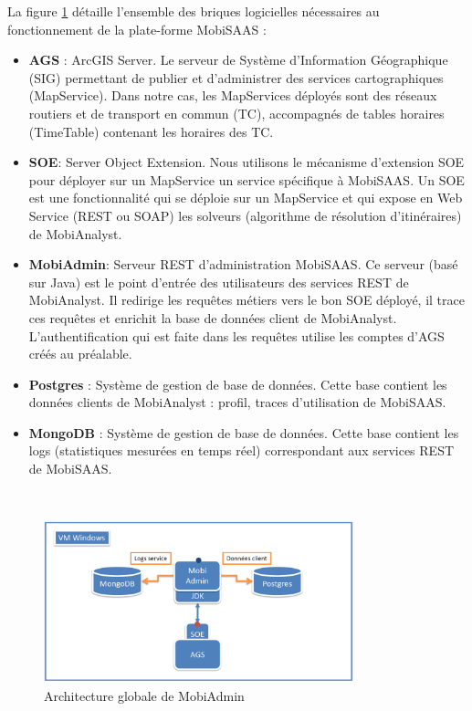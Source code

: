 La figure \ref{fig:architectureMobiAdmin} détaille l'ensemble des briques logicielles nécessaires au fonctionnement de la plate-forme MobiSAAS :
\begin{itemize}
\item \textbf{AGS} : ArcGIS Server. Le serveur de Système d'Information Géographique (SIG) permettant de publier et d'administrer des services cartographiques (MapService).
Dans notre cas, les MapServices déployés sont des réseaux routiers et de transport en commun (TC), accompagnés de tables horaires (TimeTable) contenant les horaires des TC.
\item \textbf{SOE}: Server Object Extension. Nous utilisons le mécanisme d'extension \og SOE \fg pour déployer sur un MapService un service spécifique à MobiSAAS. Un SOE est une fonctionnalité qui se déploie sur un MapService et qui expose en Web Service (REST ou SOAP) les solveurs (algorithme de résolution d'itinéraires) de MobiAnalyst.
\item \textbf{MobiAdmin}: Serveur REST d'administration MobiSAAS. Ce serveur (basé sur Java) est le point d'entrée des utilisateurs des services REST de MobiAnalyst.
Il redirige les requêtes métiers vers le bon SOE déployé, il trace ces requêtes et enrichit la base de données client de MobiAnalyst.
L'authentification qui est faite dans les requêtes utilise les comptes d'AGS créés au préalable.
\item \textbf{Postgres} : Système de gestion de base de données. Cette base contient les données clients de MobiAnalyst : profil, traces d'utilisation de MobiSAAS.
\item \textbf{MongoDB} : Système de gestion de base de données. Cette base contient les logs (statistiques mesurées en temps réel) correspondant aux services REST de MobiSAAS.
\end{itemize}\\

\begin{figure}[!h]
	\centering
		\includegraphics[width=0.8\textwidth]{images/architecture.png}
	\caption{Architecture globale de \og MobiAdmin \fg}
	\label{fig:architectureMobiAdmin}
\end{figure}\\

